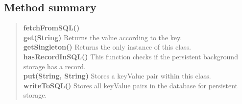 \documentclass[11pt,a4paper]{report}
\begin{document}
{{{\subsection{Method summary}{
\begin{verse}
{\bf fetchFromSQL()} \\
{\bf get(String)} Returns the value according to the key.\\
{\bf getSingleton()} Returns the only instance of this class.\\
{\bf hasRecordInSQL()} This function checks if the persistent background storage has a record.\\
{\bf put(String, String)} Stores a keyValue pair within this class.\\
{\bf writeToSQL()} Stores all keyValue pairs in the database for persistent storage.\\
\end{verse}
}
}}}
\end{document}
